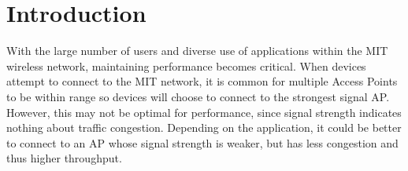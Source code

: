 \documentclass[journal]{IEEEtran}
\begin{document}







\maketitle








%
\IEEEpeerreviewmaketitle



\section{Introduction}
With the large number of users and diverse use of applications within the MIT wireless network, maintaining performance becomes critical. When devices attempt to connect to the MIT network, it is common for multiple Access Points to be within range so devices will choose to connect to the strongest signal AP. However, this may not be optimal for performance, since signal strength indicates nothing about traffic congestion. Depending on the application, it could be better to connect to an AP whose signal strength is weaker, but has less congestion and thus higher throughput.
\end{document}
